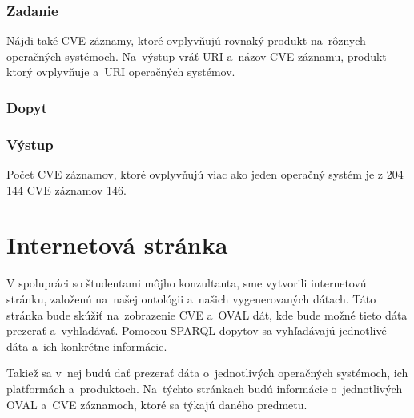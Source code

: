 \documentclass[12pt, a4paper, oneside]{book}
\begin{document}
\subsubsection*{Zadanie}
Nájdi také CVE záznamy, ktoré ovplyvňujú rovnaký produkt na~rôznych operačných systémoch. Na~výstup vráť URI a~názov CVE záznamu, produkt ktorý ovplyvňuje a~URI operačných systémov.


\subsubsection*{Dopyt}


\subsubsection*{Výstup}
Počet CVE záznamov, ktoré ovplyvňujú viac ako jeden operačný systém je z 204 144 CVE záznamov 146.



\section{Internetová stránka}
V spolupráci so študentami môjho konzultanta, sme vytvorili internetovú stránku, založenú na~našej ontológii a~našich vygenerovaných dátach. Táto stránka bude skúžiť na~zobrazenie CVE a~OVAL dát, kde bude možné tieto dáta prezerať a~vyhľadávať. Pomocou SPARQL dopytov sa vyhľadávajú jednotlivé dáta a~ich konkrétne informácie.


Takiež sa v~nej budú dať prezerať dáta o~jednotlivých operačných systémoch, ich platformách a~produktoch. Na~týchto stránkach budú informácie o~jednotlivých OVAL a~CVE záznamoch, ktoré sa týkajú daného predmetu.
\end{document}
